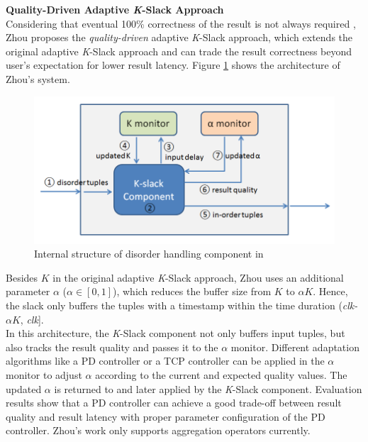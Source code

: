 \documentclass[a4paper, 11pt, twoside]{report}
\begin{document}
\noindent\textbf{Quality-Driven Adaptive \textit{K}-Slack Approach}\\

Considering that eventual 100\% correctness of the result is not always required \cite{abadi2003aurora}, Zhou \cite{Lisa} proposes the \textit{quality-driven} adaptive \textit{K}-Slack approach, which extends the original adaptive \textit{K}-Slack approach and can trade the result correctness beyond user's expectation for lower result latency. Figure \ref{fig:lisa_structure} shows the architecture of Zhou's system.\\

\begin{figure}[h]
\centering
\includegraphics[scale=0.55]{disorder_handling_component_internal_structure}
\caption{Internal structure of disorder handling component in \cite{Lisa} \label{fig:lisa_structure}}
\end{figure}

Besides $K$ in the original adaptive \textit{K}-Slack approach, Zhou uses an additional parameter $\alpha$ ($\alpha \in [0,1]$), which reduces the buffer size from $K$ to $\alpha K$. Hence, the slack only buffers the tuples with a timestamp within the time duration (\textit{clk-$\alpha K$}, \textit{clk}].\\

In this architecture, the \textit{K}-Slack component not only buffers input tuples, but also tracks the result quality and passes it to the $\alpha$ monitor. Different adaptation algorithms like a PD controller \cite{astrom1995pid} or a TCP controller \cite{Mutschler:2013:RSP:2488222.2488263} can be applied in the $\alpha$ monitor to adjust $\alpha$ according to the current and expected quality values. The updated $\alpha$ is returned to and later applied by the \textit{K}-Slack component. Evaluation results show that a PD controller can achieve a good trade-off between result quality and result latency with proper parameter configuration of the PD controller. Zhou's work only supports aggregation operators currently.\\
\end{document}
